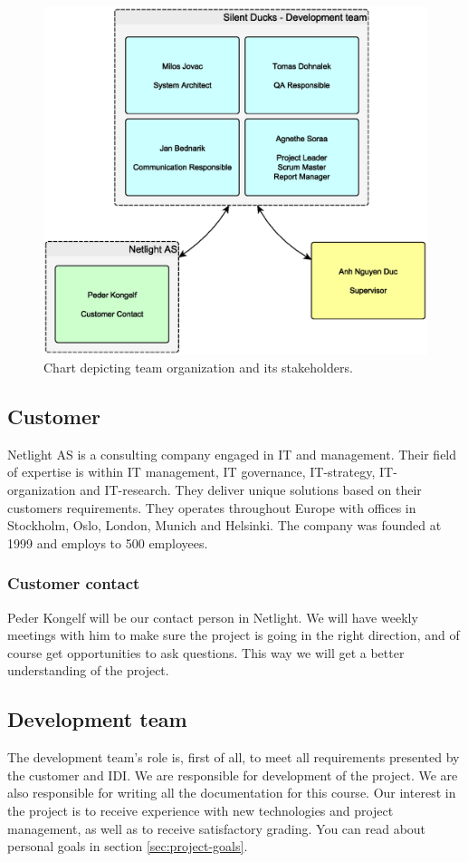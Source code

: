 \begin{figure}[!ht]
    \begin{center}
    \includegraphics[width=12cm]{images/organization_chart.eps}
    \caption{Chart depicting team organization and its stakeholders.}
    \label{img:organization_chart}
    \end{center}
\end{figure}

\subsection{Customer}
Netlight AS is a consulting company engaged in IT and management. Their field of expertise is within IT management, IT governance, IT-strategy, IT-organization and IT-research. They deliver unique solutions based on their customers requirements. They operates throughout Europe with offices in Stockholm, Oslo, London, Munich and Helsinki. The company was founded at 1999 and employs to 500 employees. 
\subsubsection{Customer contact}
Peder Kongelf will be our contact person in Netlight. We will have weekly meetings with him to make sure the project is going in the right direction, and of course get opportunities to ask questions. This way we will get a better understanding of the project.

\subsection{Development team}
 The development team's role is, first of all, to meet all requirements presented by the customer and IDI. We are responsible for development of the project. We are also responsible for writing all the documentation for this course.  Our interest in the project is to receive experience with new technologies and project management, as well as to receive satisfactory grading. You can read about personal goals in section \ref{sec:project-goals}. 
 
